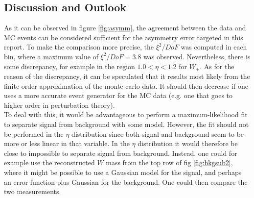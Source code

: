 \documentclass[11pt,a4paper]{article}
\begin{document}
\subsection{Discussion and Outlook}
As it can be observed in figure \ref{fig:asymm}, the agreement between the data and MC events can be considered sufficient for the asymmetry error targeted in this report. To make the comparison more precise, the $\xi^2/DoF$ was computed in each bin, where a maximum value of $\xi^2/DoF = 3.8$ was observed. Nevertheless, there is some discrepancy, for example in the region $1.0 < \eta < 1.2$ for $W_+$. As for the reason of the discrepancy, it can be speculated that it results most likely from the finite order approximation of the monte carlo data. It should then decrease if one uses a more accurate event generator for the MC data (e.g. one that goes to higher order in perturbation theory).  
\\
To deal with this, it would be advantageous to perform a maximum-likelihood fit to separate signal from background with some model. However, the fit should not be performed in the $\eta$ distribution since both signal and background seem to be more or less linear in that variable. In the $\eta$ distribution it would therefore be close to impossible to separate signal from background. Instead, one could for example use the reconstructed $W$ mass from the top row of fig \ref{fig:bkgsub2}, where it might be possible to use a Gaussian model for the signal, and perhaps an error function plus Gaussian for the background. One could then compare the two measurements. 


\end{document}
